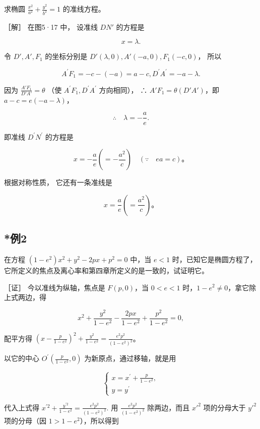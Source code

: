 求椭圆 \(\frac{x^2}{a^2} + \frac{y^2}{b^2} = 1\) 的准线方程。

［解］ 在图5·17 中， 设准线 \(DN'\) 的方程是

\[
x = \lambda.
\]

令 \(D', A', F_1\) 的坐标分别是
\(D'(\lambda, 0), A'(-a, 0), F_1(-c, 0)\)， 所以

\[
A^{\prime} F_{1} = - c - (- a) = a - c, D^{\prime} A^{\prime} = - a - \lambda.
\]

因为 \(\frac{A'F_1}{D'A'} = \theta\) （使
\(A^{\prime}F_{1}, D^{\prime}A^{\prime}\) 方向相同）， ∴
\(A'F_{1}=\theta(D'A')\)，即 \(a-c=e(-a-\lambda)\)，

\[
\therefore \quad \lambda = - \frac {a}{e}.
\]

即准线 \(D^{\prime}N^{\prime}\) 的方程是

\[
x = - \frac {a}{e} \left(= - \frac {a^{2}}{c}\right) \quad (\because \quad e a = c)\text{。}
\]

根据对称性质， 它还有一条准线是

\[
x = \frac {a}{e} \left(= \frac {a^{2}}{c}\right)\text{。}
\]

\subsection{*例2}\label{ux4f8b2-36}

在方程 \((1-e^{2})x^{2}+y^{2}-2px+p^{2}=0\) 中，当 \(e<1\)
时，已知它是椭圆方程了，它所定义的焦点及离心率和第四章所定义的是一致的，试证明它。

［证］ 今以准线为纵轴，焦点是 \(F(p,0)\)，当 \(0 < e < 1\)
时，\(1 - e^2 \neq 0\)，拿它除上式两边，得

\[
x^{2} + \frac {y^{2}}{1 - e^{2}} - \frac {2 p x}{1 - e^{2}} + \frac {p^{2}}{1 - e^{2}} = 0,
\]

配平方得
\(\left(x - \frac{p}{1 - e^2}\right)^2 + \frac{y^2}{1 - e^2} = \frac{e^2p^2}{(1 - e^2)^2}\)。

以它的中心 \(O^{\prime}\left(\frac{p}{1 - e^{2}},0\right)\)
为新原点，通过移轴，就是用

\[
\left\{ \begin{array}{l} x = x^{\prime} + \frac {p}{1 - e^{2}}, \\ y = y^{\prime} \end{array} \right. \tag {1}
\]

代入上式得
\(x^{\prime 2} + \frac{y^{\prime 2}}{1 - e^{2}} = \frac{e^{2}p^{2}}{(1 - e^{2})^{2}}.\)
用 \(\frac{e^2p^2}{(1 - e^2)^2}\) 除两边，而且 \(x'^2\) 项的分母大于
\(y'^2\) 项的分母（因 \(1 > 1 - e^2\)），所以得到

